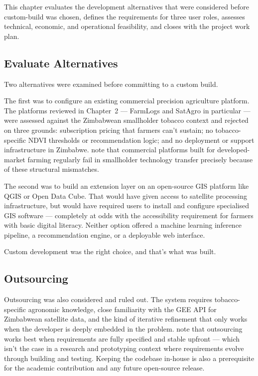 \documentclass[12pt,a4paper]{report}
\begin{document}
This chapter evaluates the development alternatives that were considered before custom-build was chosen, defines the requirements for three user roles, assesses technical, economic, and operational feasibility, and closes with the project work plan.

\subsection{Evaluate Alternatives}

Two alternatives were examined before committing to a custom build.

The first was to configure an existing commercial precision agriculture platform. The platforms reviewed in Chapter~2 — FarmLogs and SatAgro in particular — were assessed against the Zimbabwean smallholder tobacco context and rejected on three grounds: subscription pricing that farmers can't sustain; no tobacco-specific NDVI thresholds or recommendation logic; and no deployment or support infrastructure in Zimbabwe. \citet{wolfert2017} note that commercial platforms built for developed-market farming regularly fail in smallholder technology transfer precisely because of these structural mismatches.

The second was to build an extension layer on an open-source GIS platform like QGIS or Open Data Cube. That would have given access to satellite processing infrastructure, but would have required users to install and configure specialised GIS software — completely at odds with the accessibility requirement for farmers with basic digital literacy. Neither option offered a machine learning inference pipeline, a recommendation engine, or a deployable web interface.

Custom development was the right choice, and that's what was built.

\subsection{Outsourcing}

Outsourcing was also considered and ruled out. The system requires tobacco-specific agronomic knowledge, close familiarity with the GEE API for Zimbabwean satellite data, and the kind of iterative refinement that only works when the developer is deeply embedded in the problem. \citet{pfleeger2010} note that outsourcing works best when requirements are fully specified and stable upfront — which isn't the case in a research and prototyping context where requirements evolve through building and testing. Keeping the codebase in-house is also a prerequisite for the academic contribution and any future open-source release.
\end{document}
